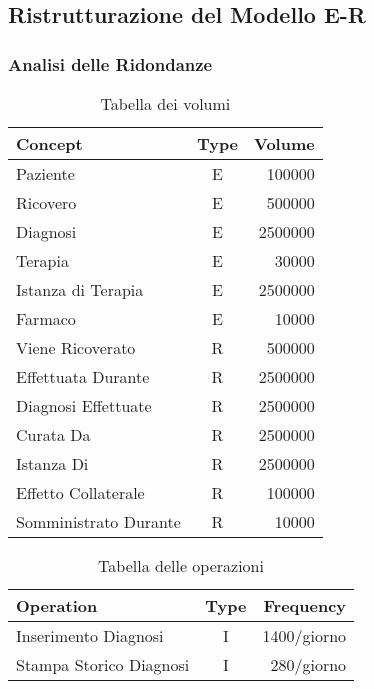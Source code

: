 \documentclass{article}
\begin{document}
\subsection{Ristrutturazione del Modello E-R}
\subsubsection{Analisi delle Ridondanze}
\begin{table}[h!]
  \caption{Tabella dei volumi}
  \label{table:1}
  \centering
  \begin{tabular}{|l|c|r|}
  \hline
  \textbf{Concept} & \textbf{Type} & \textbf{Volume} \\ \hline
  Paziente & E & 100000 \\ \hline
  Ricovero & E & 500000 \\ \hline
  Diagnosi & E & 2500000 \\ \hline
  Terapia & E & 30000 \\ \hline
  Istanza di Terapia & E & 2500000 \\ \hline
  Farmaco & E & 10000 \\ \hline
  Viene Ricoverato & R & 500000 \\ \hline
  Effettuata Durante & R & 2500000 \\ \hline
  Diagnosi Effettuate & R & 2500000 \\ \hline
  Curata Da & R & 2500000 \\ \hline
  Istanza Di & R & 2500000 \\ \hline
  Effetto Collaterale & R & 100000 \\ \hline
  Somministrato Durante  & R & 10000 \\ \hline
  \end{tabular}
  \end{table}
\begin{table}[h!]
  \caption{Tabella delle operazioni}
  \label{table:2}
  \centering
  \begin{tabular}{|l|c|r|}
  \hline
  \textbf{Operation} & \textbf{Type} & \textbf{Frequency} \\ \hline
  Inserimento Diagnosi & I & 1400/giorno \\ \hline
  Stampa Storico Diagnosi & I & 280/giorno \\ \hline
  \end{tabular}
  \end{table}
\end{document}
